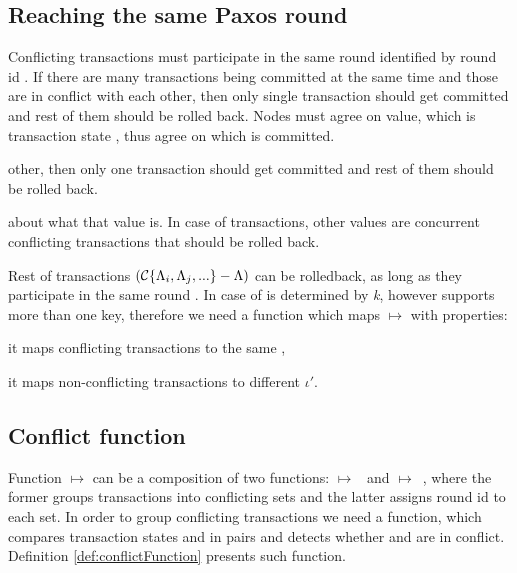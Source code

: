 \subsection{Reaching the same Paxos round}
Conflicting transactions \conflictingTxSet must participate in the same \paxos round identified by \paxos round id \paxosRoundId.
If there are many transactions \transactions being committed at the same time and those \transactions are in conflict
with each other, then only single transaction \transaction should get committed and rest of them should be rolled back. Nodes \nodesTx must agree on \paxos value, which is transaction state \txState, thus agree on which \transaction is committed.

other, then only one transaction should get committed and rest of them should be rolled back.

about what that value is. In case of transactions, other values are concurrent conflicting transactions that should be rolled back.

Rest of transactions $(\mathcal{C}\text{$\{\Lambda_{i}, \Lambda_{j}, ...\}$} - \text{$\Lambda$})$ can be rolledback, as long as they participate in the same \paxos round \paxosRoundId. In case of \lwt \paxosRoundId is determined by \emph{k}, however \mpt supports more than one key, therefore we need a function which maps \txState $\mapsto $ \paxosRoundId with properties: 
\begin{enumerate*}[label=\alph*)]
\item it maps conflicting transactions to the same \paxosRoundId,
\item it maps non-conflicting transactions to different $\iota'$.
\end{enumerate*}

\subsection{Conflict function}
Function \txState $\mapsto $ \paxosRoundId can be a composition of two functions: \mbox{\txState $\mapsto $ \conflictingTxSet} and \mbox{\conflictingTxSet $\mapsto$ \paxosRoundId}, where the former groups transactions into conflicting sets and the latter assigns \paxos round id \paxosRoundId to each set.
In order to group conflicting transactions we need a function, which compares transaction states \txStateOne and \txStateTwo in pairs and detects whether
\txStateOne and \txStateTwo are in conflict. Definition \ref{def:conflictFunction} presents such function.

